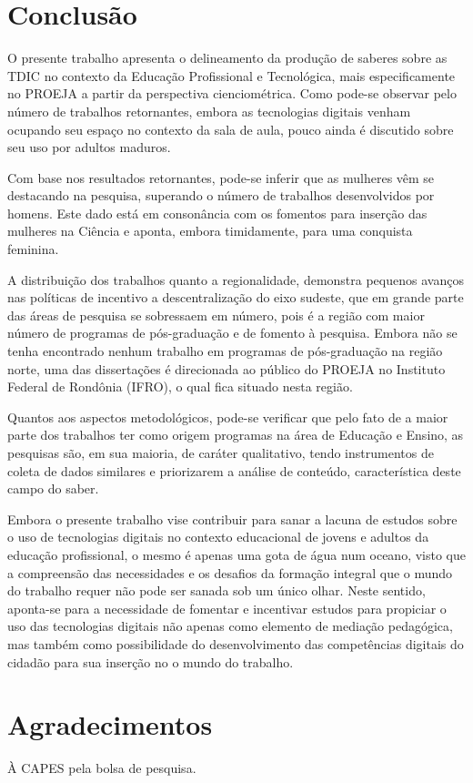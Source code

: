 \section{Conclusão}\label{sec-conclusão}

O presente trabalho apresenta o delineamento da produção de saberes
sobre as TDIC no contexto da Educação Profissional e Tecnológica, mais
especificamente no PROEJA a partir da perspectiva cienciométrica. Como
pode-se observar pelo número de trabalhos retornantes, embora as
tecnologias digitais venham ocupando seu espaço no contexto da sala de
aula, pouco ainda é discutido sobre seu uso por adultos maduros.

Com base nos resultados retornantes, pode-se inferir que as mulheres vêm
se destacando na pesquisa, superando o número de trabalhos desenvolvidos
por homens. Este dado está em consonância com os fomentos para inserção
das mulheres na Ciência e aponta, embora timidamente, para uma conquista
feminina.

A distribuição dos trabalhos quanto a regionalidade, demonstra pequenos
avanços nas políticas de incentivo a descentralização do eixo sudeste,
que em grande parte das áreas de pesquisa se sobressaem em número, pois
é a região com maior número de programas de pós-graduação e de fomento à
pesquisa. Embora não se tenha encontrado nenhum trabalho em programas de
pós-graduação na região norte, uma das dissertações é direcionada ao
público do PROEJA no Instituto Federal de Rondônia (IFRO), o qual fica
situado nesta região.

Quantos aos aspectos metodológicos, pode-se verificar que pelo fato de a
maior parte dos trabalhos ter como origem programas na área de Educação
e Ensino, as pesquisas são, em sua maioria, de caráter qualitativo,
tendo instrumentos de coleta de dados similares e priorizarem a análise
de conteúdo, característica deste campo do saber.

Embora o presente trabalho vise contribuir para sanar a lacuna de
estudos sobre o uso de tecnologias digitais no contexto educacional de
jovens e adultos da educação profissional, o mesmo é apenas uma gota de
água num oceano, visto que a compreensão das necessidades e os desafios
da formação integral que o mundo do trabalho requer não pode ser sanada
sob um único olhar. Neste sentido, aponta-se para a necessidade de
fomentar e incentivar estudos para propiciar o uso das tecnologias
digitais não apenas como elemento de mediação pedagógica, mas também
como possibilidade do desenvolvimento das competências digitais do
cidadão para sua inserção no o mundo do trabalho.

\section{Agradecimentos}\label{sec-agradecimentos}

À CAPES pela bolsa de pesquisa.